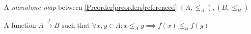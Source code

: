 

A \emph{monotone map} between \ref{Preorder|preorders|referenced} $(A, \leq_A), (B, \leq_B)$

A function $A \xrightarrow{f} B$ such that $\forall x,y \in A: x \leq_A y \implies f(x) \leq_B f(y)$